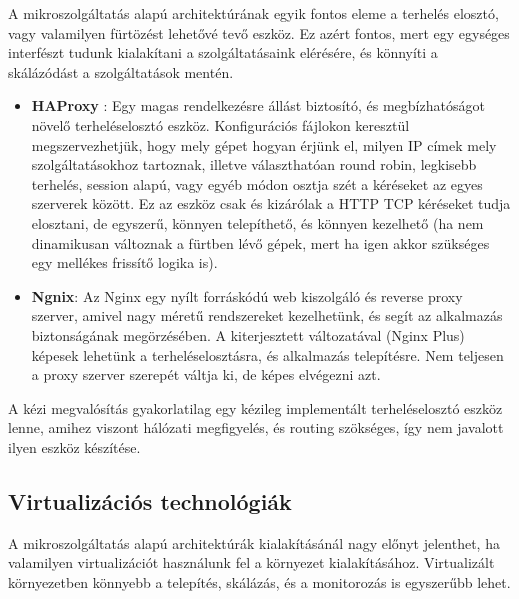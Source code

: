 \documentclass[11pt,magyar,a4paper,twoside,]{report}
\begin{document}
A mikroszolgáltatás alapú architektúrának egyik fontos eleme a terhelés
elosztó, vagy valamilyen fürtözést lehetővé tevő eszköz. Ez azért
fontos, mert egy egységes interfészt tudunk kialakítani a
szolgáltatásaink elérésére, és könnyíti a skálázódást a szolgáltatások
mentén.

\begin{itemize}
\item
  \textbf{HAProxy}\citep{haproxy} \citep{LB-haproxy}: Egy magas
  rendelkezésre állást biztosító, és megbízhatóságot növelő
  terheléselosztó eszköz. Konfigurációs fájlokon keresztül
  megszervezhetjük, hogy mely gépet hogyan érjünk el, milyen IP címek
  mely szolgáltatásokhoz tartoznak, illetve választhatóan round robin,
  legkisebb terhelés, session alapú, vagy egyéb módon osztja szét a
  kéréseket az egyes szerverek között. Ez az eszköz csak és kizárólak a
  HTTP TCP kéréseket tudja elosztani, de egyszerű, könnyen telepíthető,
  és könnyen kezelhető (ha nem dinamikusan változnak a fürtben lévő
  gépek, mert ha igen akkor szükséges egy mellékes frissítő logika is).
\item
  \textbf{Ngnix}\citep{nginx}: Az Nginx egy nyílt forráskódú web
  kiszolgáló és reverse proxy szerver, amivel nagy méretű rendszereket
  kezelhetünk, és segít az alkalmazás biztonságának megörzésében. A
  kiterjesztett változatával (Nginx Plus) képesek lehetünk a
  terheléselosztásra, és alkalmazás telepítésre. Nem teljesen a proxy
  szerver szerepét váltja ki, de képes elvégezni azt.
\end{itemize}

A kézi megvalósítás gyakorlatilag egy kézileg implementált
terheléselosztó eszköz lenne, amihez viszont hálózati megfigyelés, és
routing szökséges, így nem javalott ilyen eszköz készítése.

\subsection{Virtualizációs
technológiák}\label{virtualizuxe1ciuxf3s-technoluxf3giuxe1k}

A mikroszolgáltatás alapú architektúrák kialakításánál nagy előnyt
jelenthet, ha valamilyen virtualizációt használunk fel a környezet
kialakításához. Virtualizált környezetben könnyebb a telepítés,
skálázás, és a monitorozás is egyszerűbb lehet.
\end{document}
